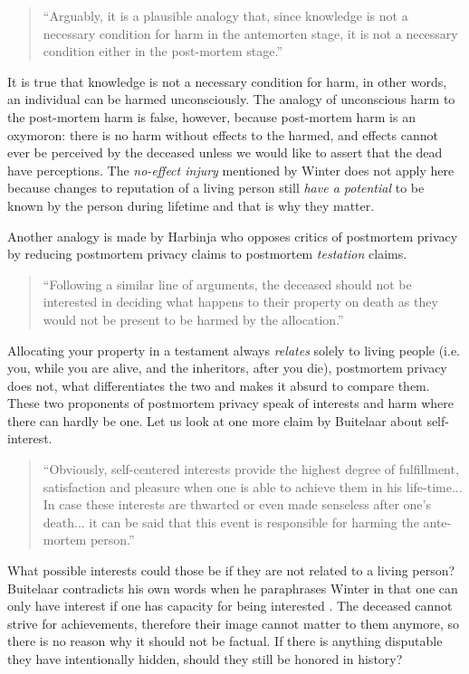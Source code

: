 \documentclass[a4paper]{article}
\begin{document}
\begin{quote}
    ``Arguably, it is a plausible analogy that, since knowledge is not a necessary condition for harm in the antemorten stage, it is not a necessary condition either in the post-mortem stage.'' \cite[p. 133]{buitelaar}
\end{quote}
    
It is true that knowledge is not a necessary condition for harm, in other words, an individual can be harmed unconsciously. 
The analogy of unconscious harm to the post-mortem harm is false, however, because post-mortem harm is an oxymoron: there is no harm without effects to the harmed, and effects cannot ever be perceived by the deceased unless we would like to assert that the dead have perceptions. The \textit{no-effect injury} \cite{winter} mentioned by Winter does not apply here because changes to reputation of a living person still \emph{have a potential} to be known by the person during lifetime and that is why they matter.

Another analogy is made by Harbinja who opposes critics of postmortem privacy by reducing postmortem privacy claims to postmortem \textit{testation} claims. 

\begin{quote}
    ``Following a similar line of arguments, the deceased should not be interested in deciding what happens to their property on death as they would not be present to be harmed by the allocation.'' \cite[p. 32]{harbinja2}
\end{quote}

Allocating your property in a testament always \emph{relates} solely to living people (i.e. you, while you are alive, and the inheritors, after you die), postmortem privacy does not, what differentiates the two and makes it absurd to compare them. These two proponents of postmortem privacy speak of interests and harm where there can hardly be one. Let us look at one more claim by Buitelaar about self-interest.

\begin{quote}
``Obviously, self-centered interests provide the highest degree of fulfillment, satisfaction and pleasure when one is able to achieve them in his life-time... 
In case these interests are thwarted or even made senseless after one's death... it can be said that this event is responsible for harming the ante-mortem person.'' \cite[p. 133]{buitelaar}
\end{quote}

\noindent What possible interests could those be if they are not related to a living person? Buitelaar contradicts his own words when he paraphrases Winter in that one can only have interest if one has capacity for being interested \cite{buitelaar}. The deceased cannot strive for achievements, therefore their image cannot matter to them anymore, so there is no reason why it should not be factual. If there is anything disputable they have intentionally hidden, should they still be honored in history?
\end{document}
